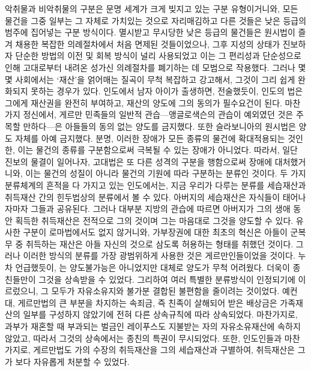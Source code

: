 악취물과 비악취물의 구분은 문명 세계가 크게 빚지고 있는 구분 유형이거니와,
모든 물건을 그중 일부는 그 자체로 가치있는 것으로 자리매김하고
다른 것들은 낮은 등급의 범주에 집어넣는 구분 방식이다.
멸시받고 무시당한
낮은 등급의 물건들은
원시법이 즐겨 채용한 복잡한 의례절차에서 처음 면제된 것들이었으나,
그후 지성의 상태가 진보하자
단순한 방법의 이전 및 회복 방식이 널리 사용되었고 이는
그 편리성과 단순성으로 인해
고대로부터 내려온 성가신 의례절차를 폐기하는 데 모범으로 작용했다.
그러나 몇몇 사회에서는
`재산'을 얽어매는 질곡이 무척 복잡하고 강고해서,
그것이 그리 쉽게 완화되지 못하는 경우가 있다.
인도에서 남자 아이가 출생하면,
전술했듯이,
인도의 법은 그에게 재산권을 완전히 부여하고,
재산의 양도에 그의 동의가 필수요건이 된다.
마찬가지 정신에서,
게르만 민족들의 일반적 관습---앵글로색슨의 관습이 예외였던 것은
주목할 만하다---은
아들들의 동의 없는 양도를 금지했다.
또한 슬라보니아의 원시법은 양도 자체를 아예 금지했다.
분명, 이러한 장애가
모든 종류의 물건에 확대적용되는 것인 한, 이는
물건의 종류를 구분함으로써 극복될 수 있는 장애가 아니었다.
따라서, 일단 진보의 물결이 일어나자,
고대법은 또 다른 성격의 구분을 행함으로써 장애에 대처했거니와,
이는 물건의 성질이 아니라 물건의 기원에 따라 구분하는 분류인 것이다.
두 가지 분류체계의 흔적을 다 가지고 있는
인도에서는, 지금 우리가 다루는 분류를
세습재산과
취득재산 간의 힌두법상의 분류에서 볼 수 있다.
아버지의 세습재산은 자식들이 태어나자마자 그들과 공유된다.
그러나 대부분 지방의 관습에 따르면
아버지가 그의 생애 동안 획득한 취득재산은 전적으로 그의 것이며
그는 마음대로 그것을 양도할 수 있다.
유사한 구분이 로마법에서도 없지 않거니와,
가부장권에 대한 최초의 혁신은
아들이 군복무 중 취득하는 재산은 아들 자신의 것으로 삼도록
허용하는 형태를 취했던 것이다.
그러나 이러한 방식의 분류를 가장 광범위하게 사용한 것은
게르만인들이었을 것이다.
누차 언급했듯이,
는 양도불가능은 아니었지만
대체로 양도가 무척 어려웠다.
더욱이 종친들만이 그것을 상속받을 수 있었다.
그리하여 여러 특별한 분류방식이 인정되기에 이르렀으니,
그 모두가 자유소유지와 불가분 결합된 불편함을 줄이려는 것이었다.
예컨대,
게르만법의 큰 부분을 차지하는
속죄금, 즉
친족이 살해되어 받은 배상금은
가족재산의 일부를 구성하지 않았기에
전혀 다른 상속규칙에 따라 상속되었다.
마찬가지로,
과부가 재혼할 때 부과되는 벌금인
레이푸스도
지불받는 자의 자유소유재산에 속하지 않았고,
따라서 그것의 상속에서는 종친의 특권이 무시되었다.
또한, 인도인들과 마찬가지로,
게르만법도
가의 수장의 취득재산을 그의 세습재산과 구별하여,
취득재산은 그가 보다 자유롭게 처분할 수 있었다.
